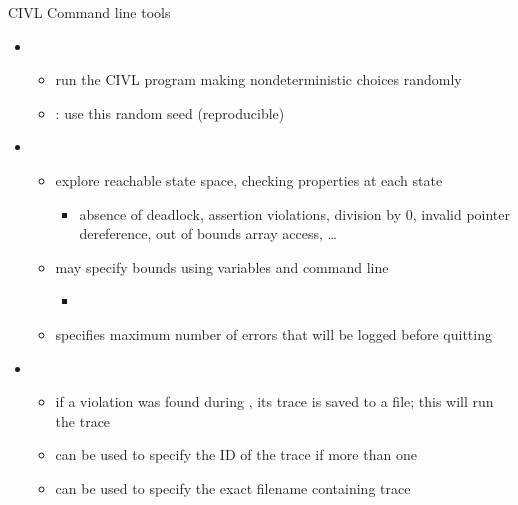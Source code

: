 \documentclass[t]{beamer}
\begin{document}
\begin{frame}{CIVL Command line tools}
  \begin{itemize}
  \item {}
    \begin{itemize}
    \item run the CIVL program making nondeterministic choices randomly
    \item {} : use this random seed (reproducible)
    \end{itemize}
  \item {}
    \begin{itemize}
    \item explore reachable state space, checking properties at each state
      \begin{itemize}
      \item absence of deadlock, assertion violations, division by $0$,
        invalid pointer dereference, out of bounds array access, \ldots
      \end{itemize}
    \item may specify bounds using \cinput{} variables and command line
      \begin{itemize}
      \item {}
      \end{itemize}
    \item {} specifies maximum number of errors that
      will be logged before quitting
    \end{itemize}
  \item {}
    \begin{itemize}
    \item  if a violation was found during , its trace
      is saved to a file; this will run the trace
    \item {} can be used to specify the ID of the trace if more than one
    \item {} can be used to specify the exact filename 
      containing trace
    \end{itemize}
  \end{itemize}  
\end{frame}
\end{document}
